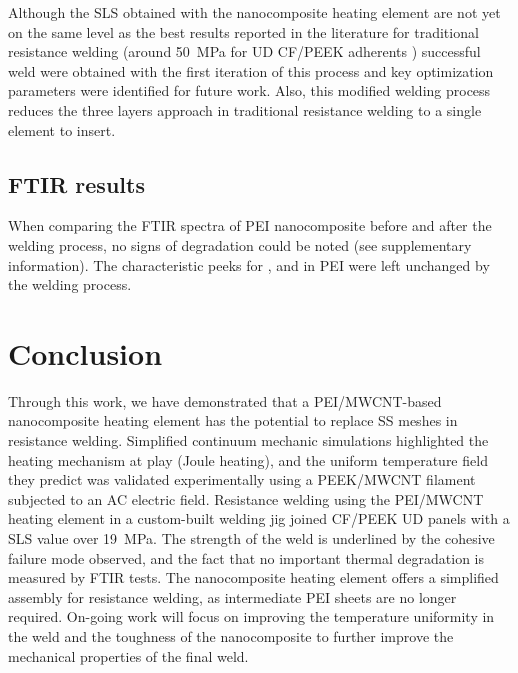 \documentclass[11pt,review,times]{elsarticle}
\begin{document}
Although the SLS obtained with the nanocomposite heating element are not yet on the same level as the best results reported in the literature for traditional resistance welding (around \SI{50}{\MPa} for UD CF/PEEK adherents \cite{Dube2015}) successful weld were obtained with the first iteration of this process and key optimization parameters were identified for future work. 
Also, this modified welding process reduces the three layers approach in traditional resistance welding to a single element to insert. 

\subsection{FTIR results}

When comparing the FTIR spectra of PEI nanocomposite before and after the welding process, no signs of degradation could be noted (see supplementary information). 
The characteristic peeks for ,  and  in PEI were left unchanged by the welding process. 

\FloatBarrier

							\section{Conclusion}

Through this work, we have demonstrated that a PEI/MWCNT-based nanocomposite heating element has the potential to replace SS meshes in resistance welding. 
Simplified continuum mechanic simulations highlighted the heating mechanism at play (Joule heating), and the uniform temperature field they predict was validated experimentally using a PEEK/MWCNT filament subjected to an AC electric field. 
Resistance welding using the PEI/MWCNT heating element in a custom-built welding jig joined CF/PEEK UD panels with a SLS value over \SI{19}{\MPa}. 
The strength of the weld is underlined by the cohesive failure mode observed, and the fact that no important thermal degradation is measured by FTIR tests. 
The nanocomposite heating element offers a simplified assembly for resistance welding, as intermediate PEI sheets are no longer required. 
On-going work will focus on improving the temperature uniformity in the weld and the toughness of the nanocomposite to further improve the mechanical properties of the final weld.

\end{document}
